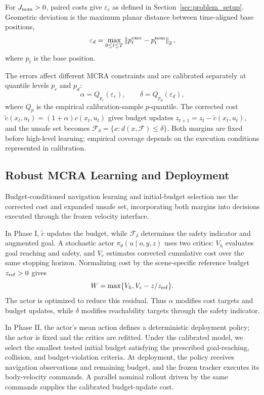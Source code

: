 \documentclass[conference]{IEEEtran}
\begin{document}
For $J_{\rm nom}>0$, paired costs give $\varepsilon_c$ as defined in
Section~\ref{sec:problem_setup}. Geometric deviation is the maximum planar
distance between time-aligned base positions,
\begin{equation}
\varepsilon_d=\max_{0\leq t\leq T} \left\|p_t^{\rm exec}-p_t^{\rm nom}\right\|_2,
\label{eq:max_planar_deviation}
\end{equation}
where $p_t$ is the base position.

The errors affect different MCRA constraints and are calibrated separately at
quantile levels $p_c$ and $p_d$:
\begin{equation}
\alpha=Q_{p_c}(\varepsilon_c),\qquad
\delta=Q_{p_d}(\varepsilon_d),
\label{eq:calibration_margins}
\end{equation}
where $Q_p$ is the empirical calibration-sample $p$-quantile. The corrected cost
$\tilde c(x_t,u_t)=(1+\alpha)c(x_t,u_t)$ gives budget updates
$z_{t+1}=z_t-\tilde c(x_t,u_t)$, and the unsafe set becomes
$\mathcal{F}_\delta=\{x:d(x,\mathcal{F})\leq\delta\}$. Both margins are fixed
before high-level learning; empirical coverage depends on the execution
conditions represented in calibration.

\subsection{Robust MCRA Learning and Deployment}
Budget-conditioned navigation learning and initial-budget selection use the
corrected cost and expanded unsafe set, incorporating both margins into decisions
executed through the frozen velocity interface.

In Phase I, $\tilde c$ updates the budget, while $\mathcal{F}_\delta$ determines
the safety indicator and augmented goal. A stochastic actor
$\pi_\theta(u\mid o,y,z)$ uses two critics: $V_h$ evaluates goal reaching and
safety, and $V_c$ estimates corrected cumulative cost over the same stopping
horizon. Normalizing cost by the scene-specific reference budget
$z_{\rm ref}>0$ gives
\begin{equation}
W=\max\{V_h,V_c-z/z_{\rm ref}\}.
\label{eq:combined_residual}
\end{equation}
The actor is optimized to reduce this residual. Thus $\alpha$ modifies cost targets and budget
updates, while $\delta$ modifies reachability targets through the safety indicator.

In Phase II, the actor's mean action defines a deterministic deployment policy;
the actor is fixed and the critics are refitted. Under the calibrated model,
we select the smallest tested initial budget satisfying the prescribed
goal-reaching, collision, and budget-violation criteria.
At deployment, the policy receives navigation observations and remaining budget,
and the frozen tracker executes its body-velocity commands. A parallel nominal
rollout driven by the same commands supplies the calibrated budget-update cost.
\end{document}
